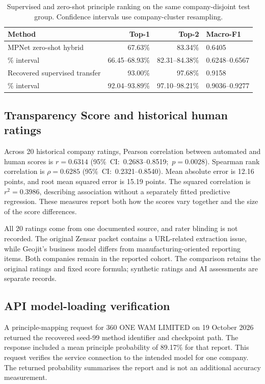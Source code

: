 \begin{table}[H]
\centering\small
\caption{Supervised and zero-shot principle ranking on the same company-disjoint test group. Confidence intervals use company-cluster resampling.}
\label{tab:mapping}
\begin{tabularx}{\linewidth}{@{}Yrrl@{}}
\toprule\textbf{Method} & \textbf{Top-1} & \textbf{Top-2} & \textbf{Macro-F1}\\\midrule
MPNet zero-shot hybrid & 67.63\% & 83.34\% & 0.6405\\
\% interval & 66.45--68.93\% & 82.31--84.38\% & 0.6248--0.6567\\
Recovered supervised transfer & 93.00\% & 97.68\% & 0.9158\\
\% interval & 92.04--93.89\% & 97.10--98.21\% & 0.9036--0.9277\\\bottomrule
\end{tabularx}
\end{table}

\subsection{Transparency Score and historical human ratings}

Across 20 historical company ratings, Pearson correlation between automated and human scores is $r=0.6314$ \mbox{(95\% CI: 0.2683--0.8519; $p=0.0028$)}. Spearman rank correlation is $\rho=0.6285$ \mbox{(95\% CI: 0.2321--0.8540)}. Mean absolute error is 12.16 points, and root mean squared error is 15.19 points. The squared correlation is $r^2=0.3986$, describing association without a separately fitted predictive regression. These measures report both how the scores vary together and the size of the score differences.

All 20 ratings come from one documented source, and rater blinding is not recorded. The original Zensar packet contains a URL-related extraction issue, while Geojit's business model differs from manufacturing-oriented reporting items. Both companies remain in the reported cohort. The comparison retains the original ratings and fixed score formula; synthetic ratings and AI assessments are separate records.

\subsection{API model-loading verification}

A principle-mapping request for 360 ONE WAM LIMITED on 19 October 2026 returned the recovered seed-99 method identifier and checkpoint path. The response included a mean principle probability of 89.17\% for that report. This request verifies the service connection to the intended model for one company. The returned probability summarises the report and is not an additional accuracy measurement.

\FloatBarrier
